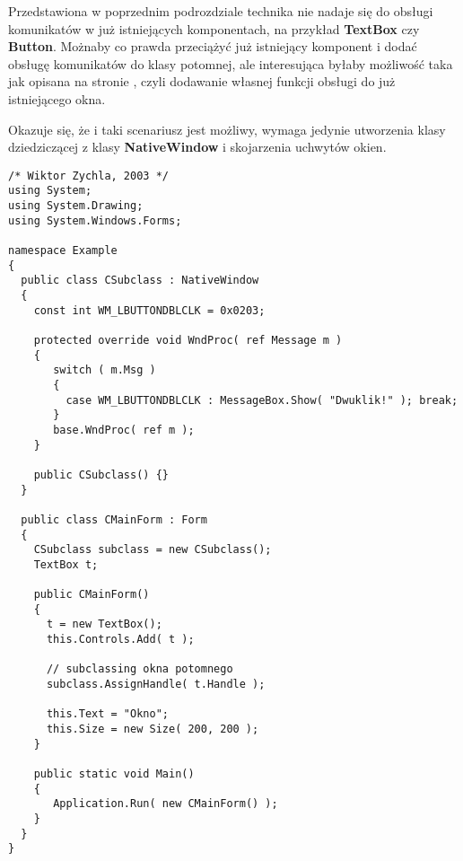 Przedstawiona w poprzednim podrozdziale technika nie nadaje się do obsługi komunikatów w już istniejących
komponentach, na przykład {\bf TextBox} czy {\bf Button}. Możnaby co prawda przeciążyć już istniejący komponent
i dodać obsługę komunikatów do klasy potomnej, ale interesująca byłaby możliwość taka jak opisana na stronie
\pageref{subclassingAPIFunkcje}, czyli dodawanie własnej funkcji obsługi do już istniejącego
okna.

Okazuje się, że i taki scenariusz jest możliwy, wymaga jedynie utworzenia klasy dziedziczącej z klasy
{\bf NativeWindow} i skojarzenia uchwytów okien. 

\begin{scriptsize}
\begin{verbatim}
/* Wiktor Zychla, 2003 */
using System;
using System.Drawing;
using System.Windows.Forms;

namespace Example
{
  public class CSubclass : NativeWindow
  {
    const int WM_LBUTTONDBLCLK = 0x0203;

    protected override void WndProc( ref Message m )
    {
       switch ( m.Msg )
       {
         case WM_LBUTTONDBLCLK : MessageBox.Show( "Dwuklik!" ); break;
       }
       base.WndProc( ref m );
    }

    public CSubclass() {} 
  }

  public class CMainForm : Form
  {   
    CSubclass subclass = new CSubclass();
    TextBox t;

    public CMainForm()
    {
      t = new TextBox();
      this.Controls.Add( t );

      // subclassing okna potomnego
      subclass.AssignHandle( t.Handle );

      this.Text = "Okno"; 
      this.Size = new Size( 200, 200 );      
    }

    public static void Main()
    {
       Application.Run( new CMainForm() );
    }
  }
}
\end{verbatim}
\end{scriptsize}

